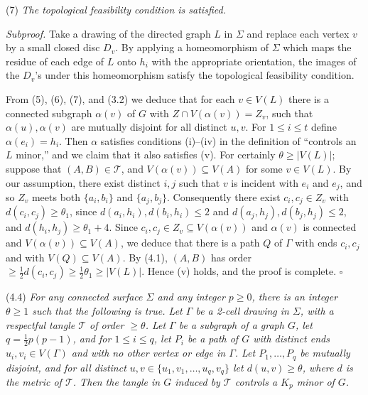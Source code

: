 \hspace*{12pt}(7) \textit{The topological feasibility condition is satisfied.}

\textit{Subproof.} Take a drawing of the directed graph $L$ in $\Sigma$ and replace each vertex $v$ by a small closed disc $D_v$. By applying a homeomorphism of $\Sigma$ which maps the residue of each edge of $L$ onto $h_i$ with the appropriate orientation, the images of the $D_v$'s under this homeomorphism satisfy the topological feasibility condition.

From (5), (6), (7), and (3.2) we deduce that for each $v \in V(L)$ there is a connected subgraph $\alpha(v)$ of $G$ with $Z \cap V(\alpha(v)) = Z_v$, such that $\alpha(u), \alpha(v)$ are mutually disjoint for all distinct $u, v$. For $1 \le i \le t$ define $\alpha(e_i) = h_i$. Then $\alpha$ satisfies conditions (i)--(iv) in the definition of ``controls an $L$ minor,'' and we claim that it also satisfies (v). For certainly $\theta \ge |V(L)|$; suppose that $(A, B) \in \mathscr{T}$, and $V(\alpha(v)) \subseteq V(A)$ for some $v \in V(L)$. By our assumption, there exist distinct $i, j$ such that $v$ is incident with $e_i$ and $e_j$, and so $Z_v$ meets both $\{a_i, b_i\}$ and $\{a_j, b_j\}$. Consequently there exist $c_i, c_j \in Z_v$ with $d(c_i, c_j) \ge \theta_1$, since $d(a_i, h_i), d(b_i, h_i) \le 2$ and $d(a_j, h_j), d(b_j, h_j) \le 2$, and $d(h_i, h_j) \ge \theta_1 + 4$. Since $c_i, c_j \in Z_v \subseteq V(\alpha(v))$ and $\alpha(v)$ is connected and $V(\alpha(v)) \subseteq V(A)$, we deduce that there is a path $Q$ of $\Gamma$ with ends $c_i, c_j$ and with $V(Q) \subseteq V(A)$. By (4.1), $(A, B)$ has order $\ge \frac{1}{2} d(c_i, c_j) \ge \frac{1}{2} \theta_1 \ge |V(L)|$. Hence (v) holds, and the proof is complete. $\square$

\stmt
(4.4) \textit{For any connected surface $\Sigma$ and any integer $p \ge 0$, there is an integer $\theta \ge 1$ such that the following is true. Let $\Gamma$ be a 2-cell drawing in $\Sigma$, with a respectful tangle $\mathscr{T}$ of order $\ge \theta$. Let $\Gamma$ be a subgraph of a graph $G$, let $q = \frac{1}{2} p(p - 1)$, and for $1 \le i \le q$, let $P_i$ be a path of $G$ with distinct ends $u_i, v_i \in V(\Gamma)$ and with no other vertex or edge in $\Gamma$. Let $P_1, \dots, P_q$ be mutually disjoint, and for all distinct $u, v \in \{u_1, v_1, \dots, u_q, v_q\}$ let $d(u, v) \ge \theta$, where $d$ is the metric of $\mathscr{T}$. Then the tangle in $G$ induced by $\mathscr{T}$ controls a $K_p$ minor of $G$.}

